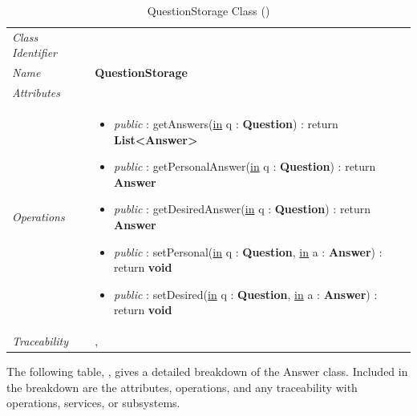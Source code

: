 \documentclass[12pt,letterpaper]{article}
\begin{document}
\begin{table}[H]
    \caption{QuestionStorage Class ()} 
	\begin{tabu} to 
		\toprule
		Class Identifier &  \\
		Name & {\bf QuestionStorage} \\
		Attributes & \\

		Operations &
		\begin{minipage}[t]{\linewidth}
			\begin{itemize}
			    \item {\it public} : getAnswers(\underline{in} q : {\bf Question}) : return {\bf List<Answer>}
			    \item {\it public} : getPersonalAnswer(\underline{in} q : {\bf Question}) : return {\bf Answer}
			    \item {\it public} : getDesiredAnswer(\underline{in} q : {\bf Question}) : return {\bf Answer}
			    \item {\it public} : setPersonal(\underline{in} q : {\bf Question}, \underline{in} a : {\bf Answer}) : return {\bf void}
			    \item {\it public} : setDesired(\underline{in} q : {\bf Question}, \underline{in} a : {\bf Answer}) : return {\bf void}
	        \end{itemize}
	    \end{minipage} \\
	    	Traceability & , \\
		\toprule
	\end{tabu}
\end{table}

The following table, , gives a detailed breakdown of the Answer class. Included in the breakdown are the attributes, operations, and any traceability with operations, services, or subsystems.
\end{document}
